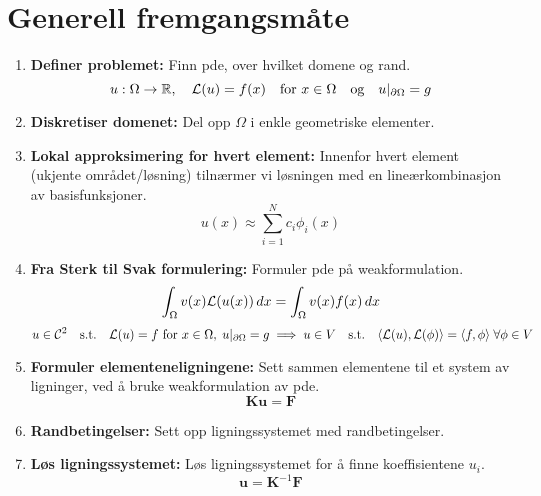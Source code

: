 \section{Generell fremgangsmåte}

\begin{enumerate}
  \item \textbf{Definer problemet:} Finn \gls{pde}, over hvilket domene og rand.
        \[
          u: \Omega \to \mathbb{R}, \quad \mathcal{L}(u) = f(x) \quad \text{for } x \in \Omega \quad \text{og} \quad u|_{\partial \Omega} = g
        \]
  \item \textbf{Diskretiser domenet:} Del opp \(\Omega\) i enkle geometriske elementer.
  \item \textbf{Lokal approksimering for hvert element:} Innenfor hvert element (ukjente området/løsning) tilnærmer vi løsningen med en lineærkombinasjon av basisfunksjoner.
        \[
          u(x) \approx \sum_{i=1}^N c_i \phi_i(x)
        \]
  \item \textbf{Fra Sterk til Svak formulering:} Formuler \gls{pde} på \gls{weakformulation}.
        \[
          \int_\Omega v(x) \mathcal{L}(u(x)) \, dx = \int_\Omega v(x) f(x) \, dx
        \]
        \[
          u \in \mathcal{C}^2 \quad \text{s.t.} \quad \Lcal(u) = f \text{ for } x \in \Omega, \; u|_{\partial \Omega} = g
          \implies
          u \in V \quad \text{s.t.} \quad \inner*{\Lcal(u), \Lcal(\phi)} = \inner*{f, \phi} \; \forall \phi \in V
        \]
  \item \textbf{Formuler elementeneligningene:} Sett sammen elementene til et system av ligninger, ved å bruke \gls{weakformulation} av \gls{pde}.
        \[
          \symbf{K} \symbf{u} = \symbf{F}
        \]
  \item \textbf{Randbetingelser:} Sett opp ligningssystemet med randbetingelser.
  \item \textbf{Løs ligningssystemet:} Løs ligningssystemet for å finne koeffisientene \(u_i\).
        \[
          \symbf{u} = \symbf{K}^{-1} \symbf{F}
        \]
\end{enumerate}

